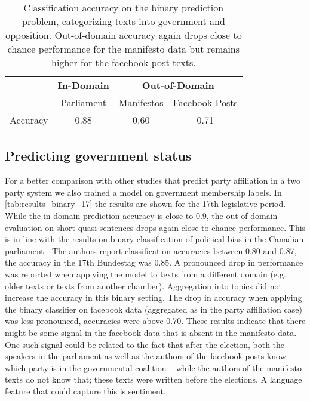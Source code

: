 \documentclass[11pt]{article}
\begin{document}
\begin{table*}[t]
\caption{
\label{tab:results_binary_17}
Classification accuracy on the binary prediction problem, categorizing texts into government and opposition. Out-of-domain accuracy again drops close to chance performance for the manifesto data but remains higher for the facebook post texts. 
}
\begin{center}
\begin{tabular}{lccc}
& {\bf In-Domain} & \multicolumn{2}{c}{{\bf Out-of-Domain}}\\
& Parliament & Manifestos & Facebook Posts\\
\hline
Accuracy    &   0.88   &   0.60&      0.71\\
%
\end{tabular}
\end{center}
\end{table*}



\subsection{Predicting government status}\label{sec:sentiment_result}
For a better comparison with other studies that predict party affiliation in a two party system we also trained a model on government membership labels. In \autoref{tab:results_binary_17} the results are shown for the 17th legislative period. While the in-domain prediction accuracy is close to 0.9, the out-of-domain evaluation on short quasi-sentences drops again close to chance performance. This is in line with the results on binary classification of political bias in the Canadian parliament \cite{Yu2008}. The authors report classification accuracies between 0.80 and 0.87, the accuracy in the 17th Bundestag was 0.85. A pronounced drop in performance was reported when applying the model to texts from a different domain (e.g. older texts or texts from another chamber). Aggregation into topics did not increase the accuracy in this binary setting. The drop in accuracy when applying the binary classifier on facebook data (aggregated as in the party affiliation case) was less pronounced, accuracies were above 0.70. These results indicate that there might be some signal in the facebook data that is absent in the manifesto data. One such signal could be related to the fact that after the election, both the speakers in the parliament as well as the authors of the facebook posts  know which party is in the governmental coalition -- while the authors of the manifesto texts do not know that; these texts were written before the elections. A language feature that could capture this is sentiment. 
\end{document}
